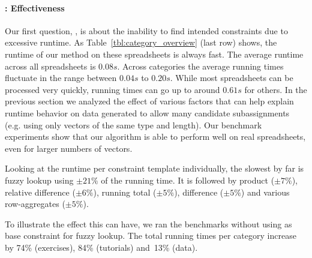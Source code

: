 \paragraph{\qone: Effectiveness}
Our first question, \qone, is about the inability to find intended constraints due to excessive runtime. As Table~\ref{tbl:category_overview} (last row) shows, the runtime of our method on these spreadsheets is always fast.  
The average runtime across all spreadsheets is $0.08s$.
Across categories the average running times fluctuate in the range between $0.04s$ to $0.20s$.
While most spreadsheets can be processed very quickly, running times can go up to around $0.61s$ for others.
In the previous section we analyzed the effect of various factors that can help explain runtime behavior on data generated to allow many candidate subassignments (e.g. using only vectors of the same type and length).
Our benchmark experiments show that our algorithm is able to perform well on real spreadsheets, even for larger numbers of vectors.




Looking at the runtime per constraint template individually, the slowest by far is fuzzy lookup using $\pm 21\%$ of the running time.
It is followed by product ($\pm 7\%$), relative difference ($\pm 6\%$), running total ($\pm 5\%$), difference ($\pm 5\%$) and various row-aggregates ($\pm 5\%$).

To illustrate the effect this can have, we ran the benchmarks without using \textit{\ecascname} as base constraint for fuzzy lookup.
The total running times per category increase by 74\% (exercises), 84\% (tutorials) and~13\% (data).


